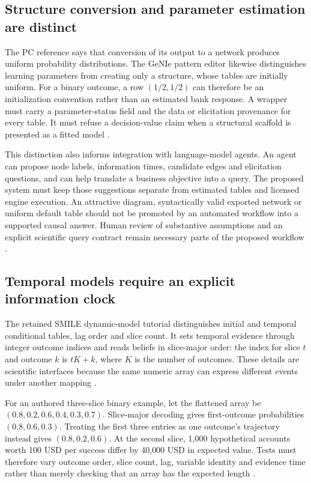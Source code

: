 \subsection{Structure conversion and parameter estimation are distinct}
The PC reference says that conversion of its output to a network produces
uniform probability distributions. The GeNIe pattern editor likewise
distinguishes learning parameters from creating only a structure, whose
tables are initially uniform. For a binary outcome, a row $(1/2,1/2)$ can
therefore be an initialization convention rather than an estimated bank
response. A wrapper must carry a parameter-status field and the data or
elicitation provenance for every table. It must refuse a decision-value
claim when a structural scaffold is presented as a fitted model
\cite{exec13_smile_pc,exec13_genie_pattern,exec24_smile_choice}.

This distinction also informs integration with language-model agents.
An agent can propose node labels, information times, candidate edges and
elicitation questions, and can help translate a business objective into a
query. The proposed system must keep those suggestions separate from
estimated tables and licensed engine execution. An attractive diagram,
syntactically valid exported network or uniform default table should not
be promoted by an automated workflow into a supported causal answer.
Human review of substantive assumptions and an explicit scientific query
contract remain necessary parts of the proposed workflow
\cite{exec24_smile_choice}.

\subsection{Temporal models require an explicit information clock}
The retained SMILE dynamic-model tutorial distinguishes initial and temporal
conditional tables, lag order and slice count. It sets temporal evidence
through integer outcome indices and reads beliefs in slice-major order:
the index for slice $t$ and outcome $k$ is $tK+k$, where $K$ is the number
of outcomes. These details are scientific interfaces because the same
numeric array can express different events under another mapping
\cite{exec13_ct_smile_tutorial}.

For an authored three-slice binary example, let the flattened array be
$(0.8,0.2,0.6,0.4,0.3,0.7)$. Slice-major decoding gives first-outcome
probabilities $(0.8,0.6,0.3)$. Treating the first three entries as one
outcome's trajectory instead gives $(0.8,0.2,0.6)$. At the second slice,
1,000 hypothetical accounts worth 100 USD per success differ by
40,000 USD in expected value. Tests must therefore vary outcome order,
slice count, lag, variable identity and evidence time rather than merely
checking that an array has the expected length \cite{exec24_smile_choice}.

